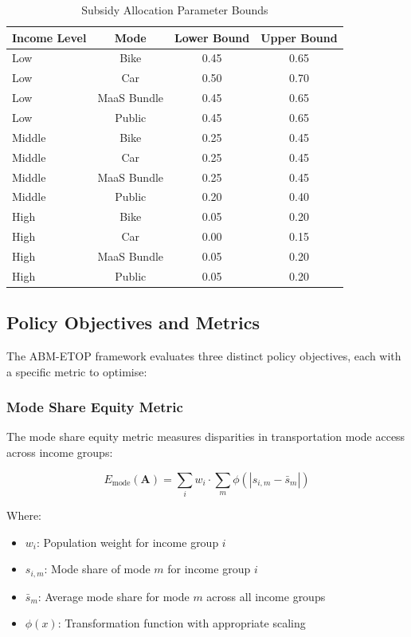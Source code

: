 \begin{table}[!h]
\centering
\caption{Subsidy Allocation Parameter Bounds}
\begin{tabular}{lccc}
\toprule
\textbf{Income Level} & \textbf{Mode} & \textbf{Lower Bound} & \textbf{Upper Bound} \\
\midrule
Low & Bike & 0.45 & 0.65 \\
Low & Car & 0.50 & 0.70 \\
Low & MaaS Bundle & 0.45 & 0.65 \\
Low & Public & 0.45 & 0.65 \\
\midrule
Middle & Bike & 0.25 & 0.45 \\
Middle & Car & 0.25 & 0.45 \\
Middle & MaaS Bundle & 0.25 & 0.45 \\
Middle & Public & 0.20 & 0.40 \\
\midrule
High & Bike & 0.05 & 0.20 \\
High & Car & 0.00 & 0.15 \\
High & MaaS Bundle & 0.05 & 0.20 \\
High & Public & 0.05 & 0.20 \\
\bottomrule
\end{tabular}
\end{table}

\subsection{Policy Objectives and Metrics}
\label{subsec:policy_objectives}

The ABM-ETOP framework evaluates three distinct policy objectives, each with a specific metric to optimise:

\subsubsection{Mode Share Equity Metric}
The mode share equity metric measures disparities in transportation mode access across income groups:

\begin{equation}
E_{\text{mode}}(\mathbf{A}) = \sum_{i} w_i \cdot \sum_{m} \phi(|s_{i,m} - \bar{s}_m|)
\end{equation}

Where:
\begin{itemize}
    \item $w_i$: Population weight for income group $i$
    \item $s_{i,m}$: Mode share of mode $m$ for income group $i$
    \item $\bar{s}_m$: Average mode share for mode $m$ across all income groups
    \item $\phi(x)$: Transformation function with appropriate scaling
\end{itemize}

